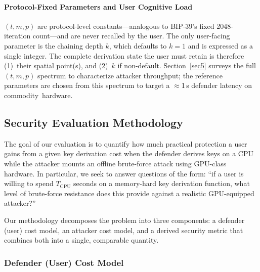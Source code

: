 \documentclass[mathematics,article,accept,pdftex,moreauthors]{Definitions/mdpi}
\begin{document}
\paragraph*{Protocol-Fixed Parameters and User Cognitive Load}

{$(t, m, p)$ are protocol-level constants---analogous to BIP-39's fixed 2048-iteration \linebreak{}count---and are never recalled by the user. The only user-facing parameter is the chaining depth $k$, which defaults to $k=1$ and is expressed as a single integer. The complete derivation state the user must retain is therefore (1)~their spatial point(s), and (2)~$k$ if non-default. Section~\ref{sec5} surveys the full $(t, m, p)$ spectrum to characterize attacker throughput; the reference parameters are chosen from this spectrum to target a $\approx$1\,s defender latency on \mbox{commodity hardware.}}


\subsection{Security Evaluation Methodology}
\label{sec:security_evaluation}

The goal of our evaluation is to quantify how much practical protection a user gains from a given key derivation cost when the defender derives keys on a CPU while the attacker mounts an offline brute-force attack using GPU-class hardware. In particular, we seek to answer questions of the form: ``if a user is willing to spend $T_{\text{CPU}}$ seconds on a memory-hard key derivation function, what level of brute-force resistance does this provide against a realistic GPU-equipped attacker?''

Our methodology decomposes the problem into three components: a defender (user) cost model, an attacker cost model, and a derived security metric that combines both into a single, comparable quantity.

\subsubsection{Defender (User) Cost Model}
\end{document}
